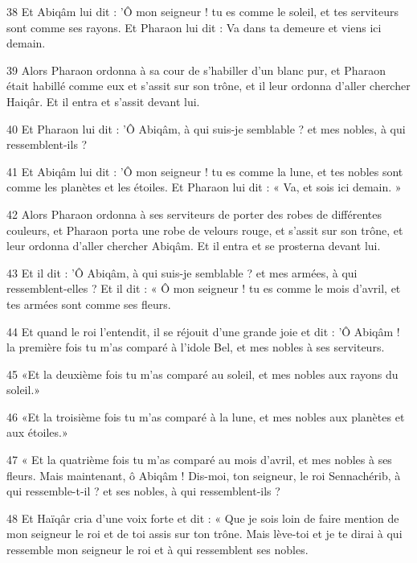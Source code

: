 \par 38 Et Abiqâm lui dit : 'Ô mon seigneur ! tu es comme le soleil, et tes serviteurs sont comme ses rayons. Et Pharaon lui dit : Va dans ta demeure et viens ici demain.

\par 39 Alors Pharaon ordonna à sa cour de s'habiller d'un blanc pur, et Pharaon était habillé comme eux et s'assit sur son trône, et il leur ordonna d'aller chercher Haiqâr. Et il entra et s'assit devant lui.

\par 40 Et Pharaon lui dit : 'Ô Abiqâm, à qui suis-je semblable ? et mes nobles, à qui ressemblent-ils ?

\par 41 Et Abiqâm lui dit : 'Ô mon seigneur ! tu es comme la lune, et tes nobles sont comme les planètes et les étoiles. Et Pharaon lui dit : « Va, et sois ici demain. »

\par 42 Alors Pharaon ordonna à ses serviteurs de porter des robes de différentes couleurs, et Pharaon porta une robe de velours rouge, et s'assit sur son trône, et leur ordonna d'aller chercher Abiqâm. Et il entra et se prosterna devant lui.

\par 43 Et il dit : 'Ô Abiqâm, à qui suis-je semblable ? et mes armées, à qui ressemblent-elles ? Et il dit : « Ô mon seigneur ! tu es comme le mois d'avril, et tes armées sont comme ses fleurs.

\par 44 Et quand le roi l'entendit, il se réjouit d'une grande joie et dit : 'Ô Abiqâm ! la première fois tu m'as comparé à l'idole Bel, et mes nobles à ses serviteurs.

\par 45 «Et la deuxième fois tu m'as comparé au soleil, et mes nobles aux rayons du soleil.»

\par 46 «Et la troisième fois tu m'as comparé à la lune, et mes nobles aux planètes et aux étoiles.»

\par 47 « Et la quatrième fois tu m'as comparé au mois d'avril, et mes nobles à ses fleurs. Mais maintenant, ô Abiqâm ! Dis-moi, ton seigneur, le roi Sennachérib, à qui ressemble-t-il ? et ses nobles, à qui ressemblent-ils ?

\par 48 Et Haïqâr cria d'une voix forte et dit : « Que je sois loin de faire mention de mon seigneur le roi et de toi assis sur ton trône. Mais lève-toi et je te dirai à qui ressemble mon seigneur le roi et à qui ressemblent ses nobles.

